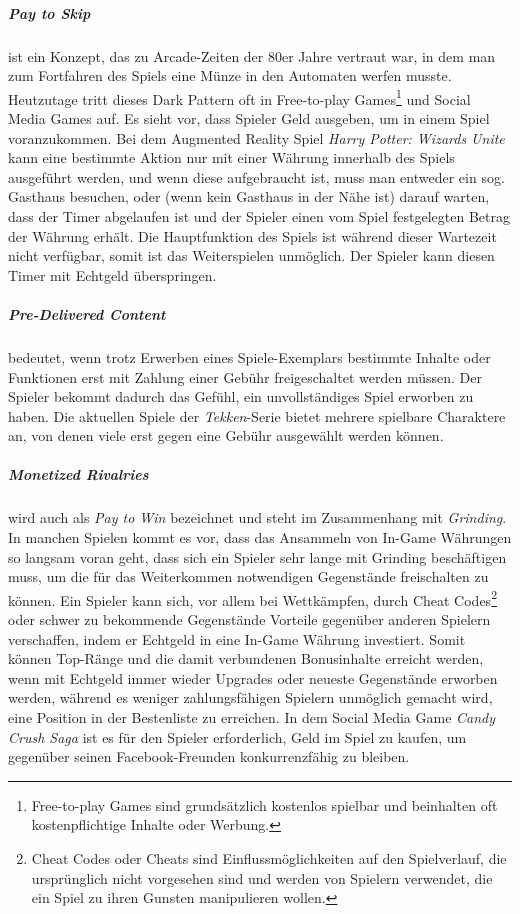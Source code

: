 \documentclass[a4paper]{article}
\begin{document}
\subparagraph{Pay to Skip} ist ein Konzept, das zu Arcade-Zeiten der 80er Jahre vertraut war, in dem man zum Fortfahren des Spiels eine Münze in den Automaten werfen musste. Heutzutage tritt dieses Dark Pattern oft in Free-to-play Games\footnote{\label{foot:10} Free-to-play Games sind grundsätzlich kostenlos spielbar und beinhalten oft kostenpflichtige Inhalte oder Werbung.} und Social Media Games auf. Es sieht vor, dass Spieler Geld ausgeben, um in einem Spiel voranzukommen.\newline
Bei dem Augmented Reality Spiel \textit{Harry Potter: Wizards Unite} kann eine bestimmte Aktion nur mit einer Währung innerhalb des Spiels ausgeführt werden, und wenn diese aufgebraucht ist, muss man entweder ein sog. Gasthaus besuchen, oder (wenn kein Gasthaus in der Nähe ist) darauf warten, dass der Timer abgelaufen ist und der Spieler einen vom Spiel festgelegten Betrag der Währung erhält. Die Hauptfunktion des Spiels ist während dieser Wartezeit nicht verfügbar, somit ist das Weiterspielen unmöglich. Der Spieler kann diesen Timer mit Echtgeld überspringen.

\subparagraph{Pre-Delivered Content} bedeutet, wenn trotz Erwerben eines Spiele-Exemplars bestimmte Inhalte oder Funktionen erst mit Zahlung einer Gebühr freigeschaltet werden müssen. Der Spieler bekommt dadurch das Gefühl, ein unvollständiges Spiel erworben zu haben.\newline
Die aktuellen Spiele der \textit{Tekken}-Serie bietet mehrere spielbare Charaktere an, von denen viele erst gegen eine Gebühr ausgewählt werden können. 


\subparagraph{Monetized Rivalries} wird auch als \textit{Pay to Win} bezeichnet und steht im Zusammenhang mit \textit{Grinding}. In manchen Spielen kommt es vor, dass das Ansammeln von In-Game Währungen so langsam voran geht, dass sich ein Spieler sehr lange mit Grinding beschäftigen muss, um die für das Weiterkommen notwendigen Gegenstände freischalten zu können.\newline
Ein Spieler kann sich, vor allem bei Wettkämpfen, durch Cheat Codes\footnote{\label{foot:11} Cheat Codes oder Cheats sind Einflussmöglichkeiten auf den Spielverlauf, die ursprünglich nicht vorgesehen sind und werden von Spielern verwendet, die ein Spiel zu ihren Gunsten manipulieren wollen.} oder schwer zu bekommende Gegenstände Vorteile gegenüber anderen Spielern verschaffen, indem er Echtgeld in eine In-Game Währung investiert. Somit können Top-Ränge und die damit verbundenen Bonusinhalte erreicht werden, wenn mit Echtgeld immer wieder Upgrades oder neueste Gegenstände erworben werden, während es weniger zahlungsfähigen Spielern unmöglich gemacht wird, eine Position in der Bestenliste zu erreichen.\newline
In dem Social Media Game \textit{Candy Crush Saga} ist es für den Spieler erforderlich, Geld im Spiel zu kaufen, um gegenüber seinen Facebook-Freunden konkurrenzfähig zu bleiben.  
\end{document}
